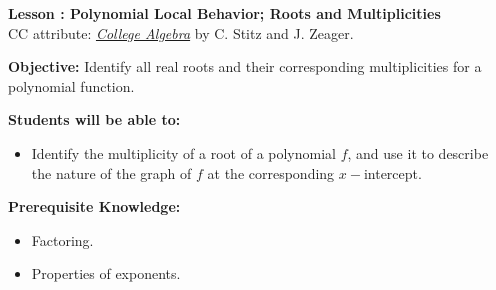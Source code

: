 \documentclass[12pt]{article}
\theoremstyle{definition}
\begin{document}
{\bf \large Lesson : Polynomial Local Behavior; Roots and Multiplicities}\label{les:local_behavior_polynomials}
\\ CC attribute: \href{http://www.stitz-zeager.com}{\it{College Algebra}} by C. Stitz and J. Zeager. 
\hfill \doclicenseImage[imagewidth=5em]\\
\par
{\bf Objective:} Identify all real roots and their corresponding multiplicities for a polynomial function.\\
\par
{\bf Students will be able to:}
\begin{itemize}
	\item Identify the multiplicity of a root of a polynomial $f$, and use it to describe the nature of the graph of $f$ at the corresponding $x-$intercept. 
\end{itemize}
{\bf Prerequisite Knowledge:}
\begin{itemize}
	\item Factoring.
	\item Properties of exponents.
\end{itemize}
\hrulefill
\end{document}
